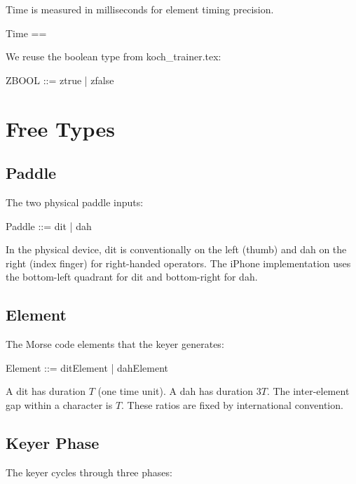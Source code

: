 \documentclass[a4paper,10pt,fleqn]{article}
\begin{document}
Time is measured in milliseconds for element timing precision.

\begin{zed}
Time == \nat
\end{zed}

We reuse the boolean type from koch\_trainer.tex:

\begin{zed}
ZBOOL ::= ztrue | zfalse
\end{zed}

\section{Free Types}

\subsection{Paddle}

The two physical paddle inputs:

\begin{zed}
Paddle ::= dit | dah
\end{zed}

In the physical device, dit is conventionally on the left (thumb) and dah on
the right (index finger) for right-handed operators. The iPhone implementation
uses the bottom-left quadrant for dit and bottom-right for dah.

\subsection{Element}

The Morse code elements that the keyer generates:

\begin{zed}
Element ::= ditElement | dahElement
\end{zed}

A dit has duration $T$ (one time unit). A dah has duration $3T$. The inter-element
gap within a character is $T$. These ratios are fixed by international convention.

\subsection{Keyer Phase}

The keyer cycles through three phases:
\end{document}
